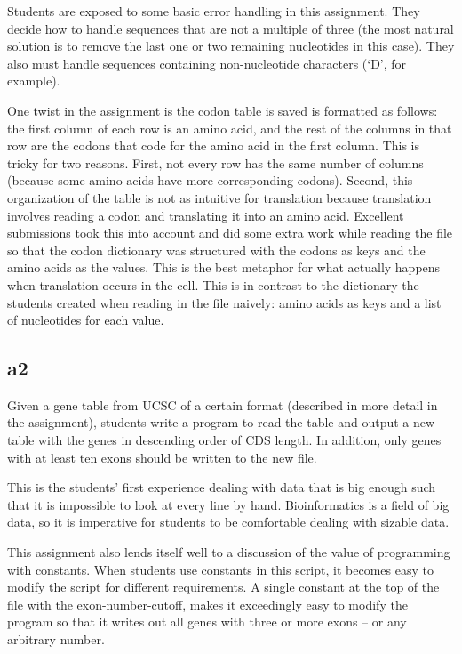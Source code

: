 \documentclass{report}
\begin{document}
Students are exposed to some basic error handling in this assignment. They decide how to handle sequences that are not a multiple of three (the most natural solution is to remove the last one or two remaining nucleotides in this case). They also must handle sequences containing non-nucleotide characters (`D', for example).

One twist in the assignment is the codon table is saved is formatted as follows: the first column of each row is an amino acid, and the rest of the columns in that row are the codons that code for the amino acid in the first column. This is tricky for two reasons. First, not every row has the same number of columns (because some amino acids have more corresponding codons). Second, this organization of the table is not as intuitive for translation because translation involves reading a codon and translating it into an amino acid. Excellent submissions took this into account and did some extra work while reading the file so that the codon dictionary was structured with the codons as keys and the amino acids as the values. This is the best metaphor for what actually happens when translation occurs in the cell. This is in contrast to the dictionary the students created when reading in the file naively: amino acids as keys and a list of nucleotides for each value.

\subsection{a2}
Given a gene table from UCSC \cite{karolchik2003ucsc} of a certain format (described in more detail in the assignment), students write a program to read the table and output a new table with the genes in descending order of CDS length. In addition, only genes with at least ten exons should be written to the new file. 

This is the students' first experience dealing with data that is big enough such that it is impossible to look at every line by hand. Bioinformatics is a field of big data, so it is imperative for students to be comfortable dealing with sizable data.

This assignment also lends itself well to a discussion of the value of programming with constants. When students use constants in this script, it becomes easy to modify the script for different requirements. A single constant at the top of the file with the exon-number-cutoff, makes it exceedingly easy to modify the program so that it writes out all genes with three or more exons -- or any arbitrary number.
\end{document}
